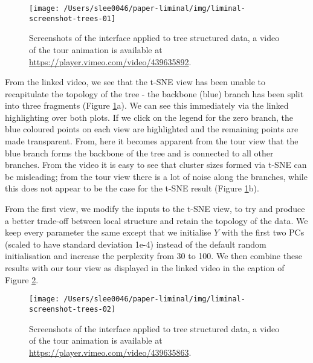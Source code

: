 \documentclass[article,notitle]{jdssv}
\begin{document}
\begin{figure}

{\centering \texttt{[image: /Users/slee0046/paper-liminal/img/liminal-screenshot-trees-01]} 

}

\caption{Screenshots of the  interface applied to tree structured data, a video of the tour animation is available at \url{https://player.vimeo.com/video/439635892}.}\label{fig:trees-01}
\end{figure}

From the linked video, we see that the t-SNE view has been unable to
recapitulate the topology of the tree - the backbone (blue) branch has been
split into three fragments (Figure \ref{fig:trees-01}a). We can see
this immediately via the linked highlighting over both
plots. If we click on the legend for the zero branch, the blue coloured points
on each view are highlighted and the remaining points are made transparent.
From, here it becomes apparent from the tour view that the blue branch forms
the backbone of the tree and is connected to all other branches. From the video
it is easy to see that cluster sizes formed via t-SNE can be misleading; from the tour
view there is a lot of noise along the branches, while this does not appear to
be the case for the t-SNE result (Figure \ref{fig:trees-01}b).

From the first view, we modify the inputs to the t-SNE view, to try and produce
a better trade-off between local structure and retain the topology of the data.
We keep every parameter the same except that we initialise \(Y\) with the first
two PCs (scaled to have standard deviation 1e-4) instead of the default random
initialisation and increase the perplexity from 30 to 100. We then combine
these results with our tour view as displayed in the linked video in the caption
of Figure \ref{fig:trees-02}.



\begin{figure}

{\centering \texttt{[image: /Users/slee0046/paper-liminal/img/liminal-screenshot-trees-02]} 

}

\caption{Screenshots of the  interface applied to tree structured data, a video of the tour animation is available at \url{https://player.vimeo.com/video/439635863}.}\label{fig:trees-02}
\end{figure}
\end{document}
